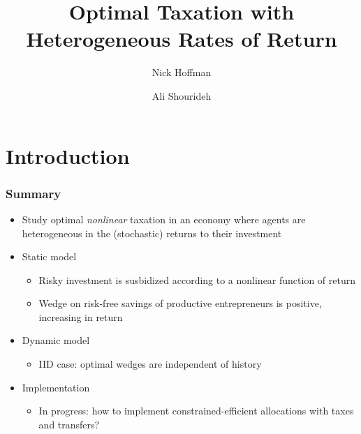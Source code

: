 \documentclass{beamer}
\title{Optimal Taxation with Heterogeneous Rates of Return}
\author[Hoffman, Shourideh]
{Nick Hoffman\inst{1} \and Ali Shourideh \inst{1}}
\institute[ ] 
{\inst{1} Carnegie Mellon University}
\begin{document}
    \begin{frame}
        \titlepage 
    \end{frame}


\section{Introduction}
\begin{frame}
    \frametitle{Summary}

    \begin{itemize}
        \item Study optimal \textit{nonlinear} taxation in an economy where agents are heterogeneous in the (stochastic) returns to their investment
        \item Static model
        \begin{itemize}
            \item Risky investment is susbidized according to a nonlinear function of return
            \item Wedge on risk-free savings of productive entrepreneurs is positive, increasing in return
        \end{itemize}
        \item Dynamic model
        \begin{itemize}
            \item IID case: optimal wedges are independent of history
        \end{itemize} 
        \item Implementation
        \begin{itemize}
            \item In progress: how to implement constrained-efficient allocations with taxes and transfers?
        \end{itemize}
    \end{itemize}

\end{frame}
\end{document}

